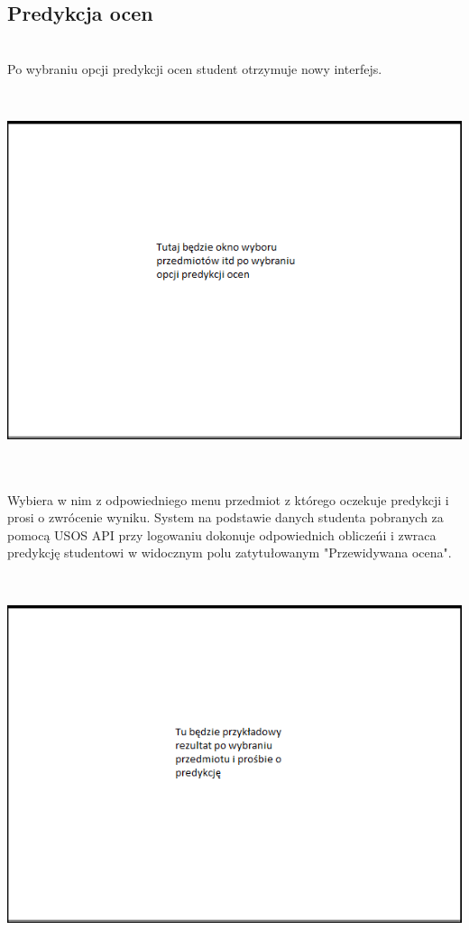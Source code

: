 \documentclass[licencjacka]{pracamgr}
\begin{document}
\subsection{Predykcja ocen}
~\\ \indent
Po wybraniu opcji predykcji ocen student otrzymuje nowy interfejs.  \par
~\\
\begin{minipage}{\linewidth}
	\centering
           \includegraphics[scale=0.7]{predykcjaocenstart.png}
\end{minipage} \\ \\


Wybiera w nim z odpowiedniego menu przedmiot z którego oczekuje predykcji i prosi o zwrócenie wyniku. System na podstawie danych studenta pobranych za pomocą USOS API przy logowaniu dokonuje odpowiednich obliczeńi i zwraca predykcję studentowi w widocznym polu zatytułowanym "Przewidywana ocena". \\ \par 
 ~\\
\begin{minipage}{\linewidth}
	\centering
           \includegraphics[scale=0.7]{predykcjaocenresult.png}
\end{minipage} \\ 
\end{document}
